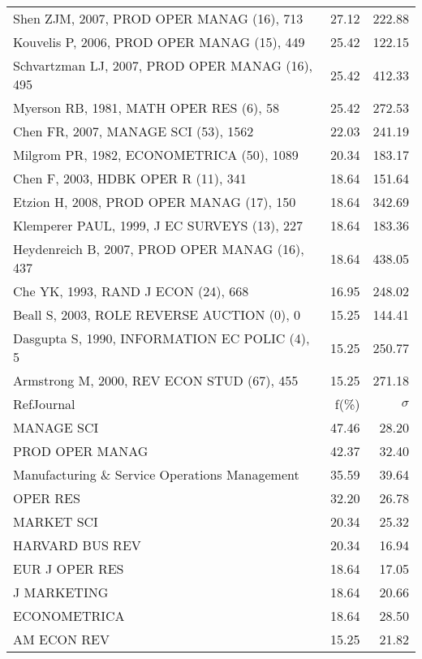 \documentclass[a4paper,11pt]{report}
\begin{document}
\begin{landscape}
\begin{table}[!ht]
{\begin{tabular}{|l r r|}
Shen ZJM, 2007, PROD OPER MANAG (16), 713 & 27.12 & 222.88\\
Kouvelis P, 2006, PROD OPER MANAG (15), 449 & 25.42 & 122.15\\
Schvartzman LJ, 2007, PROD OPER MANAG (16), 495 & 25.42 & 412.33\\
Myerson RB, 1981, MATH OPER RES (6), 58 & 25.42 & 272.53\\
Chen FR, 2007, MANAGE SCI (53), 1562 & 22.03 & 241.19\\
Milgrom PR, 1982, ECONOMETRICA (50), 1089 & 20.34 & 183.17\\
Chen F, 2003, HDBK OPER R (11), 341 & 18.64 & 151.64\\
Etzion H, 2008, PROD OPER MANAG (17), 150 & 18.64 & 342.69\\
Klemperer PAUL, 1999, J EC SURVEYS (13), 227 & 18.64 & 183.36\\
Heydenreich B, 2007, PROD OPER MANAG (16), 437 & 18.64 & 438.05\\
Che YK, 1993, RAND J ECON (24), 668 & 16.95 & 248.02\\
Beall S, 2003, ROLE REVERSE AUCTION (0), 0 & 15.25 & 144.41\\
Dasgupta S, 1990, INFORMATION EC POLIC (4), 5 & 15.25 & 250.77\\
Armstrong M, 2000, REV ECON STUD (67), 455 & 15.25 & 271.18\\
\hline
\hline
RefJournal & f(\%) & $\sigma$\\
\hline
MANAGE SCI & 47.46 & 28.20\\
PROD OPER MANAG & 42.37 & 32.40\\
Manufacturing \& Service Operations Management & 35.59 & 39.64\\
OPER RES & 32.20 & 26.78\\
MARKET SCI & 20.34 & 25.32\\
HARVARD BUS REV & 20.34 & 16.94\\
EUR J OPER RES & 18.64 & 17.05\\
J MARKETING & 18.64 & 20.66\\
ECONOMETRICA & 18.64 & 28.50\\
AM ECON REV & 15.25 & 21.82\\
\hline
\end{tabular}
}
\end{table}

\clearpage


\end{landscape}
\end{document}
